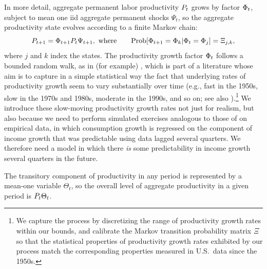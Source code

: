 In more detail, aggregate permanent labor productivity $P_t$ grows by factor $\Phi_t$, subject to mean one iid aggregate permanent shocks $\Psi_t$, so the aggregate productivity state evolves according to a finite Markov chain:
\begin{equation}
{P}_{t+1} = \Phi_{t+1} {P}_{t}\Psi_{t+1}, \text{ where} \qquad\text{Prob}[\Phi_{t+1}=\Phi_k | \Phi_t = \Phi_j] = \Xi_{j,k},   \label{eq:AggRandWalk}
\end{equation}
where $j$ and $k$ index the states. The productivity growth factor $\Phi_t$ follows a bounded random walk, as in (for example) \cite{edge2007Learning}, which is part of a literature whose aim is to capture in a simple statistical way the fact that underlying rates of productivity growth seem to vary substantially over time (e.g., fast in the 1950s, slow in the 1970s and 1980s, moderate in the 1990s, and so on; see also \cite{jorgenson:ProductivityGrowthResurgence}).\footnote{We capture the process by discretizing the range of productivity growth rates within our bounds, and calibrate the Markov transition probability matrix $\Xi$ so that the statistical properties of productivity growth rates exhibited by our process match the corresponding properties measured in U.S.\ data since the 1950s.}  We introduce these slow-moving productivity growth rates not just for realism, but also because we need to perform simulated exercises analogous to those of \cite{cmModel} on empirical data, in which consumption growth is regressed on the component of income growth that was predictable using data lagged several quarters.  We therefore need a model in which there {\it is} some predictability in income growth several quarters in the future.

The transitory component of productivity in any period is represented by a mean-one variable $\Theta_t$, so the overall level of aggregate productivity in a given period is $P_{t}\Theta_{t}$.

